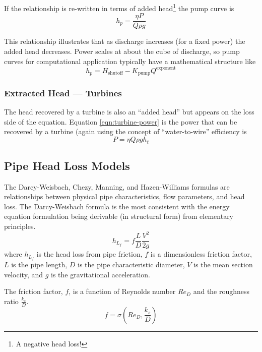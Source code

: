 If the relationship is re-written in terms of added head\footnote{A negative head loss!} the pump curve is 
\begin{equation}
h_p = \frac{\eta P}{Q\rho g}
\label{eqn:pump-curve}
\end{equation}

This relationship illustrates that as discharge increases (for a fixed power) the added head decreases.
Power scales at about the cube of discharge, so pump curves for computational application typically have a mathematical structure like
\begin{equation}
h_p =  H_{\text{shutoff}} - K_{\text{pump}}Q^{\text{exponent}}
\label{eqn:pump-curve-2}
\end{equation}

\subsubsection{Extracted Head --- Turbines}
The head recovered by a turbine is also an ``added head'' but appears on the loss side of the equation.   Equation \ref{eqn:turbine-power} is the power that can be recovered by a turbine (again using the concept of ``water-to-wire'' efficiency is 
\begin{equation}
P=\eta Q\rho g h_t
\label{eqn:turbine-power}
\end{equation}


\subsection{Pipe Head Loss Models}
The Darcy-Weisbach, Chezy, Manning, and Hazen-Williams formulas are relationships between physical pipe characteristics, flow parameters, and head loss.   The Darcy-Weisbach formula is the most consistent with the energy equation formulation  being derivable (in structural form) from elementary principles.
\begin{equation}
h_{L_f}=f \frac{L}{D} \frac{V^2}{2g}
\label{eqn:dw-headloss}
\end{equation}
where $h_{L_f}$ is the head loss from pipe friction, $f$ is a dimensionless friction factor, $L$ is the pipe length, $D$ is the pipe characteristic diameter, $V$ is the mean section velocity, and $g$ is the gravitational acceleration.  

The friction factor, $f$, is a function of Reynolds number $Re_D$ and the roughness ratio $\frac{k_s}{D}$.
\begin{equation}
f=\sigma(Re_D,\frac{k_s}{D})
\label{eqn:friction-factor-dimensionless}
\end{equation}


